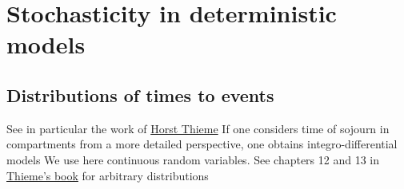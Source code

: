 \documentclass[aspectratio=169]{beamer}\usepackage[]{graphicx}\usepackage[]{xcolor}
\begin{document}
% 
% 



\section{Stochasticity in deterministic models}


\subsection{Distributions of times to events}

\begin{frame}
See in particular the work of \href{https://scholar.google.ca/citations?user=o7R6ZHMAAAAJ}{Horst Thieme}
\vfill
If one considers time of sojourn in compartments from a more detailed perspective, one obtains integro-differential models
\vfill
We use here continuous random variables. See chapters 12 and 13 in \href{https://press.princeton.edu/books/paperback/9780691092911/mathematics-in-population-biology}{Thieme's book} for arbitrary distributions
\end{frame}
\end{document}
